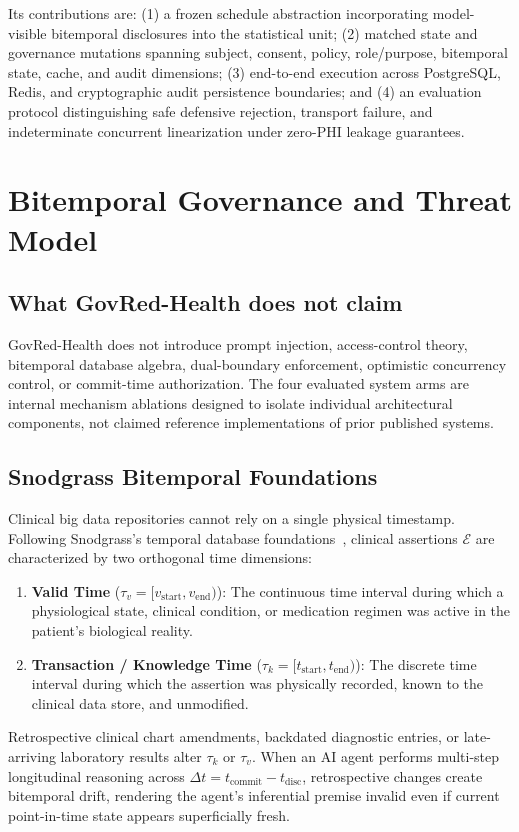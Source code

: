 \documentclass[conference]{IEEEtran}
\begin{document}
Its contributions are: (1) a frozen schedule abstraction incorporating model-visible bitemporal disclosures into the statistical unit; (2) matched state and governance mutations spanning subject, consent, policy, role/purpose, bitemporal state, cache, and audit dimensions; (3) end-to-end execution across PostgreSQL, Redis, and cryptographic audit persistence boundaries; and (4) an evaluation protocol distinguishing safe defensive rejection, transport failure, and indeterminate concurrent linearization under zero-PHI leakage guarantees.

\section{Bitemporal Governance and Threat Model}
\subsection{What GovRed-Health does not claim}
GovRed-Health does not introduce prompt injection, access-control theory, bitemporal database algebra, dual-boundary enforcement, optimistic concurrency control, or commit-time authorization. The four evaluated system arms are internal mechanism ablations designed to isolate individual architectural components, not claimed reference implementations of prior published systems.

\subsection{Snodgrass Bitemporal Foundations}
Clinical big data repositories cannot rely on a single physical timestamp. Following Snodgrass's temporal database foundations~\cite{snodgrass1995}, clinical assertions $\mathcal{E}$ are characterized by two orthogonal time dimensions:
\begin{enumerate}
\item \textbf{Valid Time} ($\tau_v = [v_{\text{start}}, v_{\text{end}})$): The continuous time interval during which a physiological state, clinical condition, or medication regimen was active in the patient's biological reality.
\item \textbf{Transaction / Knowledge Time} ($\tau_k = [t_{\text{start}}, t_{\text{end}})$): The discrete time interval during which the assertion was physically recorded, known to the clinical data store, and unmodified.
\end{enumerate}
Retrospective clinical chart amendments, backdated diagnostic entries, or late-arriving laboratory results alter $\tau_k$ or $\tau_v$. When an AI agent performs multi-step longitudinal reasoning across $\Delta t = t_{\text{commit}} - t_{\text{disc}}$, retrospective changes create bitemporal drift, rendering the agent's inferential premise invalid even if current point-in-time state appears superficially fresh.
\end{document}
